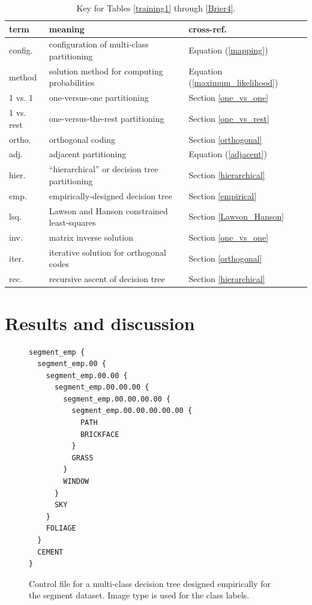 \begin{table}
	\caption{Key for Tables \ref{training1} through \ref{Brier4}.}\label{key}
	\begin{tabular}{|lll|}
		\hline
		term & meaning & cross-ref. \\
		\hline\hline
		config. & configuration of multi-class partitioning & Equation (\ref{mapping}) \\
		method & solution method for computing probabilities & Equation (\ref{maximum_likelihood}) \\
		\hline
		1 vs. 1 & one-versus-one partitioning & Section \ref{one_vs_one} \\
		1 vs. rest & one-versus-the-rest partitioning & Section \ref{one_vs_rest} \\
		ortho. & orthogonal coding & Section \ref{orthogonal} \\
		adj. & adjacent partitioning & Equation (\ref{adjacent}) \\
		hier. & ``hierarchical'' or decision tree partitioning & Section \ref{hierarchical} \\
		emp. & empirically-designed decision tree & Section \ref{empirical} \\
		\hline
		lsq. & Lawson and Hanson constrained least-squares & Section \ref{Lawson_Hanson} \\
		inv. & matrix inverse solution & Section \ref{one_vs_one} \\
		iter. & iterative solution for orthogonal codes & Section \ref{orthogonal} \\
		rec. & recursive ascent of decision tree & Section \ref{hierarchical} \\
		\hline
	\end{tabular}
\end{table}


\section{Results and discussion}

\label{results}



\begin{figure}[htp]
	\begin{boxedminipage}{\textwidth}
		\begin{small}
		\begin{verbatim}
segment_emp {
  segment_emp.00 {
    segment_emp.00.00 {
      segment_emp.00.00.00 {
        segment_emp.00.00.00.00 {
          segment_emp.00.00.00.00.00 {
            PATH
            BRICKFACE
          }
          GRASS
        }
        WINDOW
      }
      SKY
    }
    FOLIAGE
  }
  CEMENT
}
		\end{verbatim}
		\end{small}
	\end{boxedminipage}
	\caption{Control file for a multi-class decision tree designed empirically for the segment dataset. Image type is used for the class labels.}
	\label{segment}
\end{figure}

